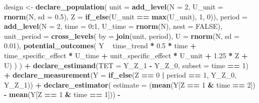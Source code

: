 \documentclass[
]{article}
\newenvironment{Shaded}{\begin{snugshade}}{\end{snugshade}}
\newcommand{\DataTypeTok}[1]{\textcolor[rgb]{0.13,0.29,0.53}{#1}}
\newcommand{\DecValTok}[1]{\textcolor[rgb]{0.00,0.00,0.81}{#1}}
\newcommand{\FloatTok}[1]{\textcolor[rgb]{0.00,0.00,0.81}{#1}}
\newcommand{\KeywordTok}[1]{\textcolor[rgb]{0.13,0.29,0.53}{\textbf{#1}}}
\newcommand{\NormalTok}[1]{#1}
\newcommand{\OperatorTok}[1]{\textcolor[rgb]{0.81,0.36,0.00}{\textbf{#1}}}
\newcommand{\OtherTok}[1]{\textcolor[rgb]{0.56,0.35,0.01}{#1}}
\newcommand{\StringTok}[1]{\textcolor[rgb]{0.31,0.60,0.02}{#1}}
\begin{document}
\begin{Shaded}
\begin{Highlighting}[]
\NormalTok{design <-}\StringTok{ }
\StringTok{  }\KeywordTok{declare_population}\NormalTok{(}
    \DataTypeTok{unit =} \KeywordTok{add_level}\NormalTok{(}\DataTypeTok{N =} \DecValTok{2}\NormalTok{, }\DataTypeTok{U_unit =} \KeywordTok{rnorm}\NormalTok{(N, }\DataTypeTok{sd =} \FloatTok{0.5}\NormalTok{), }\DataTypeTok{Z =} \KeywordTok{if_else}\NormalTok{(U_unit }\OperatorTok{==}\StringTok{ }\KeywordTok{max}\NormalTok{(U_unit), }\DecValTok{1}\NormalTok{, }\DecValTok{0}\NormalTok{)),}
    \DataTypeTok{period =} \KeywordTok{add_level}\NormalTok{(}\DataTypeTok{N =} \DecValTok{2}\NormalTok{, }\DataTypeTok{time =} \DecValTok{0}\OperatorTok{:}\DecValTok{1}\NormalTok{, }\DataTypeTok{U_time =} \KeywordTok{rnorm}\NormalTok{(N), }\DataTypeTok{nest =} \OtherTok{FALSE}\NormalTok{),}
    \DataTypeTok{unit_period =} \KeywordTok{cross_levels}\NormalTok{(}
      \DataTypeTok{by =} \KeywordTok{join}\NormalTok{(unit, period), }
      \DataTypeTok{U =} \KeywordTok{rnorm}\NormalTok{(N, }\DataTypeTok{sd =} \FloatTok{0.01}\NormalTok{),}
      \KeywordTok{potential_outcomes}\NormalTok{(}
\NormalTok{        Y }\OperatorTok{~}\StringTok{ }\NormalTok{time_trend }\OperatorTok{*}\StringTok{ }\FloatTok{0.5} \OperatorTok{*}\StringTok{ }\NormalTok{time }\OperatorTok{+}\StringTok{ }
\StringTok{          }\NormalTok{time_specific_effect }\OperatorTok{*}\StringTok{ }\NormalTok{U_time }\OperatorTok{+}\StringTok{ }
\StringTok{          }\NormalTok{unit_specific_effect }\OperatorTok{*}\StringTok{ }\NormalTok{U_unit }\OperatorTok{+}\StringTok{ }
\StringTok{          }\FloatTok{1.25} \OperatorTok{*}\StringTok{ }\NormalTok{Z }\OperatorTok{+}\StringTok{ }\NormalTok{U)}
\NormalTok{    )}
\NormalTok{  ) }\OperatorTok{+}\StringTok{ }
\StringTok{  }\KeywordTok{declare_estimand}\NormalTok{(}\DataTypeTok{TET =}\NormalTok{ Y_Z_}\DecValTok{1} \OperatorTok{-}\StringTok{ }\NormalTok{Y_Z_}\DecValTok{0}\NormalTok{, }\DataTypeTok{subset =}\NormalTok{ time }\OperatorTok{==}\StringTok{ }\DecValTok{1}\NormalTok{) }\OperatorTok{+}\StringTok{ }
\StringTok{  }\KeywordTok{declare_measurement}\NormalTok{(}\DataTypeTok{Y =} \KeywordTok{if_else}\NormalTok{(Z }\OperatorTok{==}\StringTok{ }\DecValTok{0} \OperatorTok{|}\StringTok{ }\NormalTok{period }\OperatorTok{==}\StringTok{ }\DecValTok{1}\NormalTok{, Y_Z_}\DecValTok{0}\NormalTok{, Y_Z_}\DecValTok{1}\NormalTok{)) }\OperatorTok{+}\StringTok{ }
\StringTok{  }\KeywordTok{declare_estimator}\NormalTok{(}
    \DataTypeTok{estimate =} 
\NormalTok{      (}\KeywordTok{mean}\NormalTok{(Y[Z }\OperatorTok{==}\StringTok{ }\DecValTok{1} \OperatorTok{&}\StringTok{ }\NormalTok{time }\OperatorTok{==}\StringTok{ }\DecValTok{2}\NormalTok{]) }\OperatorTok{-}\StringTok{ }\KeywordTok{mean}\NormalTok{(Y[Z }\OperatorTok{==}\StringTok{ }\DecValTok{1} \OperatorTok{&}\StringTok{ }\NormalTok{time }\OperatorTok{==}\StringTok{ }\DecValTok{1}\NormalTok{])) }\OperatorTok{-}\StringTok{ }

\end{Highlighting}
\end{Shaded}
\end{document}
